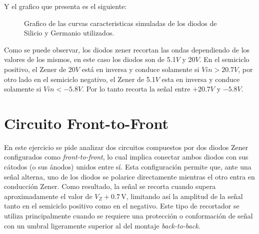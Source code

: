 \documentclass[chaptersright]{informeutn}
\begin{document}
        Y el grafico que presenta es el siguiente:
        \begin{figure}[!ht]
          \centering
          \caption{Grafico de las curvas caracteristicas simuladas de los diodos de Silicio y Germanio utilizados.}
          \label{graph.simulation.recortador.btb}
        \end{figure}

        Como se puede observar, los diodos zener recortan las ondas dependiendo de los valores de los mismos, en
        este caso los diodos son de 5.1$V$ y 20$V$. En el semiciclo positivo, el Zener de 20$V$ está en inversa y
        conduce solamente si $Vin > 20.7V$, por otro lado en el semiciclo negativo, el Zener de 5.1$V$ esta en
        inversa y conduce solamente si $Vin <-5.8V$. Por lo tanto recorta la señal entre $+20.7V$ y $-5.8V$.

        \section{Circuito Front-to-Front}
          En este ejercicio se pide analizar dos circuitos compuestos por dos diodos Zener configurados como 
          \textit{front-to-front}, lo cual implica conectar ambos diodos con sus cátodos (o sus ánodos) unidos entre
          sí. Esta configuración permite que, ante una señal alterna, uno de los diodos se polarice directamente
          mientras el otro entra en conducción Zener. Como resultado, la señal se recorta cuando supera aproximadamente
          el valor de $V_Z + 0.7\,\text{V}$, limitando así la amplitud de la señal tanto en el semiciclo positivo como
          en el negativo. Este tipo de recortador se utiliza principalmente cuando se requiere una protección o
          conformación de señal con un umbral ligeramente superior al del montaje \textit{back-to-back}.
\end{document}
